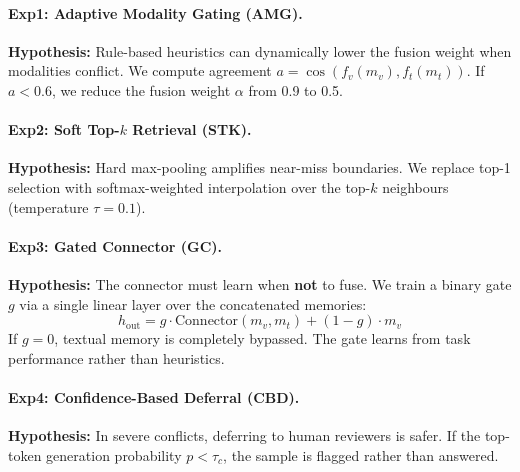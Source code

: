 \documentclass{article}
\begin{document}
\paragraph{Exp1: Adaptive Modality Gating (AMG).}
\textbf{Hypothesis:} Rule-based heuristics can dynamically lower the fusion weight when modalities conflict. We compute agreement $a = \cos(f_v(m_v), f_t(m_t))$. If $a < 0.6$, we reduce the fusion weight $\alpha$ from 0.9 to 0.5.

\paragraph{Exp2: Soft Top-$k$ Retrieval (STK).}
\textbf{Hypothesis:} Hard max-pooling amplifies near-miss boundaries. We replace top-1 selection with softmax-weighted interpolation over the top-$k$ neighbours (temperature $\tau=0.1$).

\paragraph{Exp3: Gated Connector (GC).}
\textbf{Hypothesis:} The connector must learn when \textbf{not} to fuse. We train a binary gate $g$ via a single linear layer over the concatenated memories:
\begin{equation}
  h_\text{out} = g \cdot \text{Connector}(m_v, m_t) + (1-g) \cdot m_v
\end{equation}
If $g=0$, textual memory is completely bypassed. The gate learns from task performance rather than heuristics.

\paragraph{Exp4: Confidence-Based Deferral (CBD).}
\textbf{Hypothesis:} In severe conflicts, deferring to human reviewers is safer. If the top-token generation probability $p < \tau_c$, the sample is flagged rather than answered.



\newpage




\end{document}
